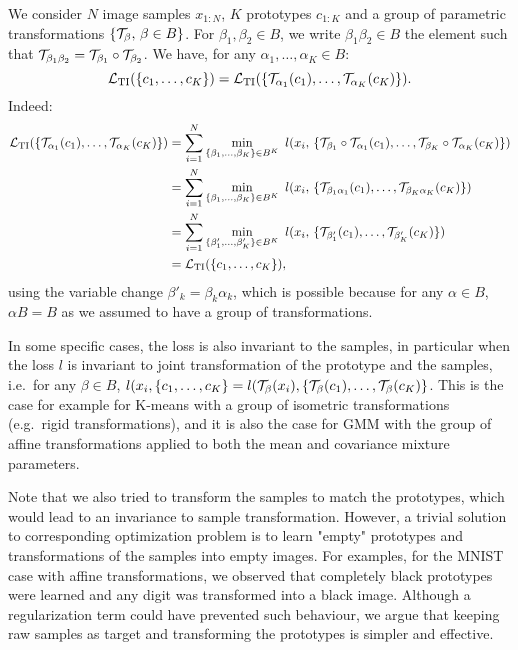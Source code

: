 \documentclass{article}
\begin{document}
We consider $N$ image samples $x_{1:N}$, $K$ prototypes $c_{1:K}$ and a group of parametric 
transformations $\{{\mathcal T}_\beta,\, \beta\in B \}$.  For $\beta_1,\beta_2 \in B$, we write 
$\beta_1\beta_2 \in B$ the element such that ${\mathcal T}_{\beta_1 \beta_2}={\mathcal T}_{\beta_1} \circ 
{\mathcal T}_{\beta_2}$. We have, for any $\alpha_1, \ldots,\alpha_K \in B$:\begin{equation*}
  \mathcal{L}_{\textrm{TI}}(\{ c_1, \ldots , 
  c_K\})=\mathcal{L}_{\textrm{TI}}(\{{\mathcal T}_{\alpha_1}(c_1), \ldots , {\mathcal T}_{\alpha_K}(c_K)\}).
\end{equation*}
Indeed:\vspace{-0.5em}\begin{align*}
  \mathcal{L}_{\textrm{TI}}(\{{\mathcal T}_{\alpha_1}(c_1),\ldots , 
  {\mathcal T}_{\alpha_K}(c_K)\})&=\sum_{i=1}^N \min_{\{\beta_1,\ldots, \beta_K\} \in B^K}\  l(x_i,\,
  \{{\mathcal T}_{\beta_1}\circ {\mathcal T}_{\alpha_1}(c_1), \ldots,{\mathcal T}_{\beta_K}\circ 
{\mathcal T}_{\alpha_K}(c_K)\})\\
  &= \sum_{i=1}^N \min_{\{\beta_1,\ldots, \beta_K\} \in B^K}\  l(x_i,\,
  \{{\mathcal T}_{\beta_1\alpha_1}(c_1), \ldots,{\mathcal T}_{\beta_K\alpha_K}(c_K)\})\\
  &=\sum_{i=1}^N \min_{\{\beta'_1,\ldots, \beta'_K\} \in B^K}\  l(x_i,\,
  \{{\mathcal T}_{\beta'_1}(c_1), \ldots,{\mathcal T}_{\beta'_K}(c_K)\})\\
  &=\mathcal{L}_{\textrm{TI}}(\{ c_1,\ldots , c_K\}),
  \label{eq:tiproof}
\end{align*}
using the variable change $\beta'_k=\beta_k\alpha_k$, which is possible because for any 
$\alpha \in B$, $\alpha B = B$ as we assumed to have a group of transformations.

In some specific cases, the loss is also invariant to the samples, in particular when the 
loss $l$ is invariant to joint transformation of the prototype and the samples, i.e.\ for
any $\beta \in B$, $l(x_i,\{c_1,\ldots, c_K\}=l({\mathcal T}_\beta(x_i),\{{\mathcal T}_\beta(c_1),\ldots,
{\mathcal T}_\beta(c_K)\}$. This is the case for example for K-means with a group of isometric 
transformations (e.g.\ rigid transformations), and it is also the case for GMM with the group 
of affine transformations applied to both the mean and covariance mixture parameters.

Note that we also tried to transform the samples to match the prototypes, which would lead to 
an invariance to sample transformation. However, a trivial solution to corresponding 
optimization problem is to learn "empty" prototypes and transformations of the samples into 
empty images. For examples, for the MNIST case with affine transformations, we observed that 
completely black prototypes were learned and any digit was transformed into a black image.  
Although a regularization term could have prevented such behaviour, we argue that keeping raw 
samples as target and transforming the prototypes is simpler and effective.
\end{document}
